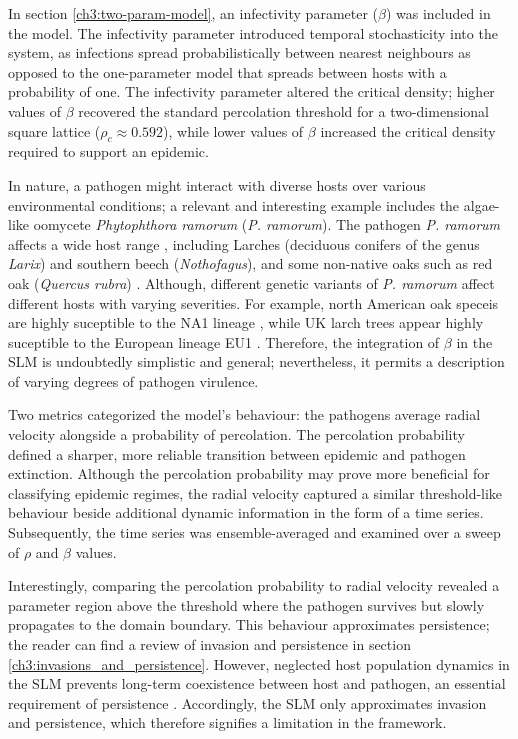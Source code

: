 In section \ref{ch3:two-param-model}, an infectivity parameter ($\beta$) was included in the model.
The infectivity parameter introduced temporal stochasticity into the system, as infections spread probabilistically between nearest neighbours \textemdash
as opposed to the one-parameter model that spreads between hosts with a probability of one.
The infectivity parameter altered the critical density; 
higher values of $\beta$ recovered the standard percolation threshold for a two-dimensional square lattice ($\rho_c\approx 0.592$), 
while lower values of $\beta$ increased the critical density required to support an epidemic.

In nature, a pathogen might interact with diverse hosts over various environmental conditions;
a relevant and interesting example includes the algae-like oomycete \textit{Phytophthora ramorum} (\textit{P. ramorum}). 
The pathogen \textit{P. ramorum} affects a wide host range \cite{GRUNWALD2012131}, 
including Larches (deciduous conifers of the genus \textit{Larix}) and southern beech (\textit{Nothofagus}), 
and some non-native oaks such as red oak (\textit{Quercus rubra}) \cite{grunwald2008phytophthora}.
Although, different genetic variants of \textit{P. ramorum} affect different hosts with varying severities.
For example, north American oak speceis are highly suceptible to the NA1 lineage \cite{rizzo2002phytophthora}, 
while UK larch trees appear highly suceptible to the European lineage EU1 \cite{king2015planta}. 
Therefore, the integration of $\beta$ in the SLM is undoubtedly simplistic and general; nevertheless, it permits a description of varying degrees of pathogen virulence.

Two metrics categorized the model's behaviour: the pathogens average radial velocity alongside a probability of percolation.
The percolation probability defined a sharper, more reliable transition between epidemic and pathogen extinction.
Although the percolation probability may prove more beneficial for classifying epidemic regimes, 
the radial velocity captured a similar threshold-like behaviour beside additional dynamic information in the form of a time series.
Subsequently, the time series was ensemble-averaged and examined over a sweep of $\rho$ and $\beta$ values. 

Interestingly, comparing the percolation probability to radial velocity revealed a parameter region above the threshold where the pathogen survives but slowly propagates to the domain boundary. 
This behaviour approximates persistence; the reader can find a review of invasion and persistence in section \ref{ch3:invasions_and_persistence}.
However, neglected host population dynamics in the SLM prevents long-term coexistence between host and pathogen, 
an essential requirement of persistence \cite{gilligan2008epidemiological}. 
Accordingly, the SLM only approximates invasion and persistence, which therefore signifies a limitation in the framework. 

